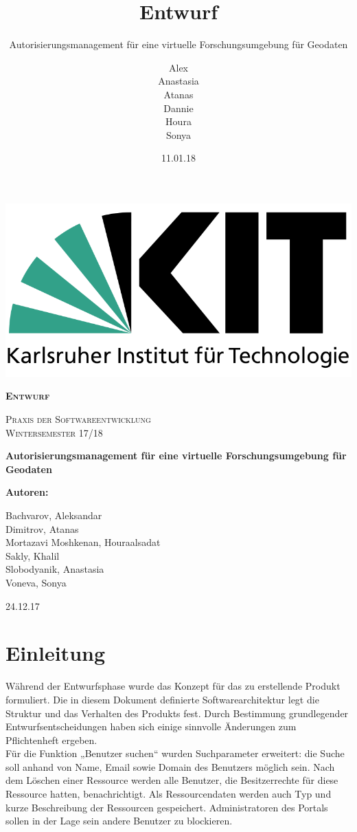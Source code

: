 \documentclass[parskip=full,11pt]{scrartcl}
\title{Entwurf}
\subtitle{Autorisierungsmanagement für eine virtuelle Forschungsumgebung für Geodaten}
\author{Alex\\Anastasia\\Atanas\\Dannie\\ Houra\\Sonya\\}
\date{11.01.18}
\begin{document}
 
 \begin{titlepage}
 	
 	\begin{center}
 	\includegraphics[width=0.5\linewidth]{res/KITLogo.png}\\
 	\vspace{2cm}
 	{\scshape\LARGE\bfseries Entwurf \par}
 	\vspace{0.5cm}
 	{\scshape\Large Praxis der Softwareentwicklung\\}
 	\vspace{1cm}
 	{\scshape\Large Wintersemester 17/18\\}
 	\vspace{2cm}
 	{\huge\bfseries Autorisierungsmanagement für eine virtuelle Forschungsumgebung für Geodaten\par}
 	\vspace{2cm}
 	\vfill
 	{\bfseries {\Large Autoren}:\par}
 	{\Large Bachvarov, Aleksandar }\\
 	{\Large Dimitrov, Atanas }\\
 	{\Large Mortazavi Moshkenan, Houraalsadat }\\
 	{\Large Sakly, Khalil }\\
 	{\Large Slobodyanik, Anastasia }\\
 	{\Large Voneva, Sonya}\\
 	\vfill
 	{\large 24.12.17 \par}
 	\end{center}
 \end{titlepage}
 
 \tableofcontents
 
 \newpage
 \section{Einleitung}
 
Während der Entwurfsphase wurde das Konzept für das zu erstellende Produkt formuliert. Die in diesem Dokument definierte Softwarearchitektur legt die Struktur und das Verhalten des Produkts fest. Durch Bestimmung grundlegender Entwurfsentscheidungen haben sich einige sinnvolle Änderungen zum Pflichtenheft ergeben. \\
Für die Funktion „Benutzer suchen“ wurden Suchparameter erweitert: die Suche soll anhand von Name, Email sowie Domain des Benutzers möglich sein. 
Nach dem Löschen einer Ressource werden alle Benutzer, die Besitzerrechte für diese Ressource hatten, benachrichtigt. 
Als Ressourcendaten werden auch Typ und kurze Beschreibung der Ressourcen gespeichert. 
Administratoren des Portals sollen in der Lage sein andere Benutzer zu blockieren.
\end{document}
